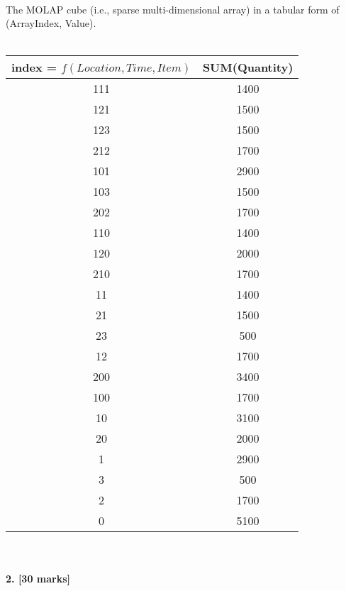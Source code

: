 \documentclass[a4paper]{scrartcl}
\begin{document}
\begin{enumerate}[label=\arabic*)]
\\
The MOLAP cube (i.e., sparse multi-dimensional array) in a tabular form of  (ArrayIndex, Value).\\
\\
\begin{tabular}{ c | c}
  \hline index = $f(Location,Time,Item)$ & SUM(Quantity)   \\
  \hline 111 &1400 \\
  \hline 121 &1500 \\
  \hline 123 &1500 \\
  \hline 212 &1700 \\
  \hline 101 &2900 \\
  \hline 103 &1500 \\
  \hline 202 &1700 \\
  \hline 110 &1400\\
  \hline  120 &2000 \\
  \hline  210 &1700 \\
  \hline 11 &1400\\
  \hline 21 &1500 \\
  \hline 23 &500\\
  \hline 12 &1700 \\
  \hline 200 &3400 \\
  \hline 100 &1700 \\
  \hline 10 &3100 \\
  \hline 20 &2000 \\
  \hline 1 &2900 \\
  \hline 3 &500 \\
  \hline 2 &1700 \\
  \hline 0 &5100 \\
  \hline\end{tabular}\\
\end{enumerate}
\paragraph{2. [30 marks]}
\label{sec:Question 2}
\end{document}
